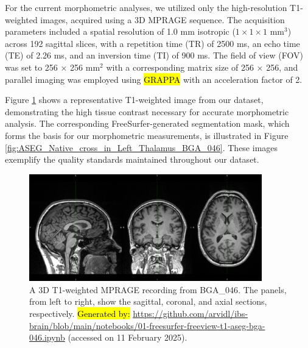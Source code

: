 \documentclass[diagnostics,article,accept,pdftex,moreauthors]{Definitions/mdpi}
\begin{document}
 For the current morphometric analyses, we utilized only the high-resolution T1-weighted images, acquired using a 3D MPRAGE  sequence. The acquisition parameters included a spatial resolution of 1.0 mm isotropic ($1 \times 1 \times 1$ mm$^3$) across 192 sagittal slices, with a repetition time (TR) of 2500 ms, an echo time (TE) of 2.26 ms, and an inversion time (TI) of 900 ms. The field of view (FOV) was set to 256 × 256 mm$^2$ with a corresponding matrix size of 256 × 256, and parallel imaging was employed using \hl{GRAPPA} %
 with an acceleration factor of 2.

 Figure \ref{fig:T1_mprage_BGA_046} shows a representative T1-weighted image from our dataset, demonstrating the high tissue contrast necessary for accurate morphometric analysis. The corresponding FreeSurfer-generated segmentation mask, which forms the basis for our morphometric measurements, is illustrated in Figure \ref{fig:ASEG_Native_cross_in_Left_Thalamus_BGA_046}. These images exemplify the quality standards maintained throughout our dataset.  \\

\vspace{-9pt}
\begin{figure}[H]
\includegraphics[width=0.9\textwidth]{figs/T1_mprage_BGA_046.png}
\caption{{{A 3D T1-weighted MPRAGE recording from BGA\_046}}. {The panels, from left to} 
 right, show the sagittal, coronal, and axial sections, respectively. 
{\hl{Generated by: } %
{{\url{https://github.com/arvidl/ibs-brain/blob/main/notebooks/01-freesurfer-freeview-t1-aseg-bga-046.ipynb}}}} (accessed on 11 February 2025).}

\label{fig:T1_mprage_BGA_046}
\end{figure}
\vspace{-10pt}
\end{document}
